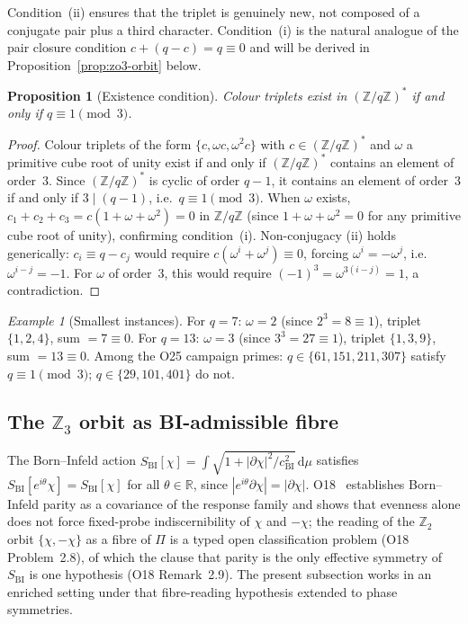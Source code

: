 \documentclass[11pt,a4paper]{article}
\newtheorem{proposition}[theorem]{Proposition}
\theoremstyle{definition}
\theoremstyle{remark}
\newtheorem{example}[theorem]{Example}
\newcommand{\cBI}{c_{\mathrm{BI}}}
\newcommand{\Z}{\mathbb{Z}}
\newcommand{\R}{\mathbb{R}}
\begin{document}
      Condition~(ii) ensures that the triplet is genuinely new, not composed of a conjugate pair
      plus a third character.
      Condition~(i) is the natural analogue of the pair closure condition $c + (q-c) = q \equiv 0$
      and will be derived in Proposition~\ref{prop:zo3-orbit} below.

      \begin{proposition}[Existence condition]
        \label{prop:existence}
        Colour triplets exist in $(\Z/q\Z)^*$ if and only if $q \equiv 1 \pmod{3}$.
      \end{proposition}

      \begin{proof}
        Colour triplets of the form $\{c, \omega c, \omega^2 c\}$ with $c \in (\Z/q\Z)^*$ and
        $\omega$ a primitive cube root of unity exist if and only if $(\Z/q\Z)^*$ contains an element
        of order~$3$.
        Since $(\Z/q\Z)^*$ is cyclic of order $q-1$, it contains an element of order~$3$ if and only
        if $3 \mid (q-1)$, i.e.\ $q \equiv 1 \pmod{3}$.
        When $\omega$ exists, $c_1 + c_2 + c_3 = c(1 + \omega + \omega^2) = 0$ in $\Z/q\Z$ (since
        $1 + \omega + \omega^2 = 0$ for any primitive cube root of unity), confirming condition~(i).
        Non-conjugacy (ii) holds generically: $c_i \equiv q - c_j$ would require $c(\omega^i + \omega^j)
        \equiv 0$, forcing $\omega^i = -\omega^j$, i.e.\ $\omega^{i-j} = -1$.
        For $\omega$ of order~$3$, this would require $(-1)^3 = \omega^{3(i-j)} = 1$, a contradiction.
      \end{proof}

      \begin{example}[Smallest instances]
For $q = 7$: $\omega = 2$ (since $2^3 = 8 \equiv 1$), triplet $\{1, 2, 4\}$, sum $= 7 \equiv 0$.
For $q = 13$: $\omega = 3$ (since $3^3 = 27 \equiv 1$), triplet $\{1, 3, 9\}$, sum $= 13 \equiv 0$.
Among the O25 campaign primes: $q \in \{61, 151, 211, 307\}$ satisfy $q \equiv 1 \pmod{3}$;
$q \in \{29, 101, 401\}$ do not.
      \end{example}

    \subsection{The $\Z_3$ orbit as BI-admissible fibre}
      \label{ssec:zo3-orbit}

      The Born--Infeld action $S_{\mathrm{BI}}[\chi] = \int \sqrt{1 + |\partial\chi|^2/\cBI^2}\,\mathrm{d}\mu$
      satisfies $S_{\mathrm{BI}}[e^{i\theta}\chi] = S_{\mathrm{BI}}[\chi]$ for all $\theta \in \R$,
      since $|e^{i\theta}\partial\chi| = |\partial\chi|$.
      O18~\cite{Beau2026a22} establishes Born--Infeld parity as a covariance of the response family and
      shows that evenness alone does not force fixed-probe indiscernibility of $\chi$ and
      $-\chi$; the reading of the $\Z_2$ orbit $\{\chi, -\chi\}$ as a fibre of $\Pi$ is a
      typed open classification problem (O18 Problem~2.8), of which the clause that parity is
      the only effective symmetry of $S_{\mathrm{BI}}$ is one hypothesis (O18 Remark~2.9).
      The present subsection works in an enriched setting under that fibre-reading hypothesis
      extended to phase symmetries.
\end{document}
